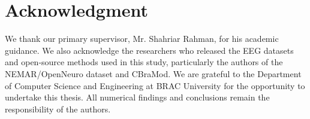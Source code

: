 \chapter*{Acknowledgment}
We thank our primary supervisor, Mr. Shahriar Rahman, for his academic guidance. We also acknowledge the researchers who released the EEG datasets and open-source methods used in this study, particularly the authors of the NEMAR/OpenNeuro dataset and CBraMod. We are grateful to the Department of Computer Science and Engineering at BRAC University for the opportunity to undertake this thesis. All numerical findings and conclusions remain the responsibility of the authors.
